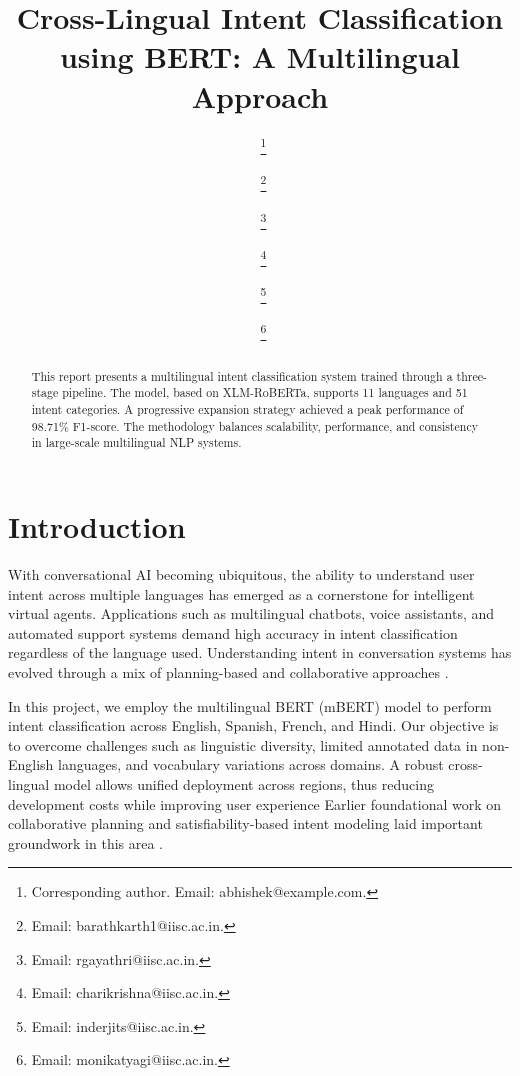 \documentclass{ecai}
\begin{document}

\begin{frontmatter}


\title{Cross-Lingual Intent Classification using BERT: A Multilingual Approach}

\author[A]{~\thanks{Corresponding author. Email: abhishek@example.com.}}
\author[A]{~\snm{}\thanks{Email: barathkarth1@iisc.ac.in.}}
\author[A]{~\thanks{Email: rgayathri@iisc.ac.in.}}
\author[A]{~\thanks{Email: charikrishna@iisc.ac.in.}}
\author[A]{~\thanks{Email: inderjits@iisc.ac.in.}}
\author[A]{~\thanks{Email: monikatyagi@iisc.ac.in.}}

\address[A]{Indian Institute of Science, Bengaluru}

\begin{abstract}
This report presents a multilingual intent classification system trained through a three-stage pipeline. The model, based on XLM-RoBERTa, supports 11 languages and 51 intent categories. A progressive expansion strategy achieved a peak performance of 98.71\% F1-score. The methodology balances scalability, performance, and consistency in large-scale multilingual NLP systems.
\end{abstract}

\end{frontmatter}


\section{Introduction}
With conversational AI becoming ubiquitous, the ability to understand user intent across multiple languages has emerged as a cornerstone for intelligent virtual agents. Applications such as multilingual chatbots, voice assistants, and automated support systems demand high accuracy in intent classification regardless of the language used. Understanding intent in conversation systems has evolved through a mix of planning-based and collaborative approaches \cite{grosz1996collaborative,kautz1992planning}.

In this project, we employ the multilingual BERT (mBERT) model to perform intent classification across English, Spanish, French, and Hindi. Our objective is to overcome challenges such as linguistic diversity, limited annotated data in non-English languages, and vocabulary variations across domains. A robust cross-lingual model allows unified deployment across regions, thus reducing development costs while improving user experience Earlier foundational work on collaborative planning and satisfiability-based intent modeling laid important groundwork in this area \cite{grosz1996collaborative,kautz1992planning}.
\end{document}
